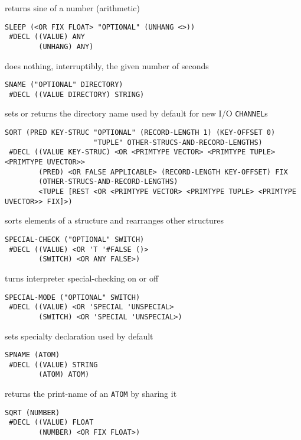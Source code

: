 \documentclass[a4paper]{scrbook}
\begin{document}
returns sine of a number (arithmetic)

\begin{verbatim}
SLEEP (<OR FIX FLOAT> "OPTIONAL" (UNHANG <>))
 #DECL ((VALUE) ANY
        (UNHANG) ANY)
\end{verbatim}

does nothing, interruptibly, the given number of seconds

\begin{verbatim}
SNAME ("OPTIONAL" DIRECTORY)
 #DECL ((VALUE DIRECTORY) STRING)
\end{verbatim}

sets or returns the directory name used by default for new I/O \texttt{CHANNEL}s

\begin{verbatim}
SORT (PRED KEY-STRUC "OPTIONAL" (RECORD-LENGTH 1) (KEY-OFFSET 0)
                     "TUPLE" OTHER-STRUCS-AND-RECORD-LENGTHS)
 #DECL ((VALUE KEY-STRUC) <OR <PRIMTYPE VECTOR> <PRIMTYPE TUPLE> <PRIMTYPE UVECTOR>>
        (PRED) <OR FALSE APPLICABLE> (RECORD-LENGTH KEY-OFFSET) FIX
        (OTHER-STRUCS-AND-RECORD-LENGTHS)
        <TUPLE [REST <OR <PRIMTYPE VECTOR> <PRIMTYPE TUPLE> <PRIMTYPE UVECTOR>> FIX]>)
\end{verbatim}

sorts elements of a structure and rearranges other structures

\begin{verbatim}
SPECIAL-CHECK ("OPTIONAL" SWITCH)
 #DECL ((VALUE) <OR 'T '#FALSE ()>
        (SWITCH) <OR ANY FALSE>)
\end{verbatim}

turns interpreter special-checking on or off

\begin{verbatim}
SPECIAL-MODE ("OPTIONAL" SWITCH)
 #DECL ((VALUE) <OR 'SPECIAL 'UNSPECIAL>
        (SWITCH) <OR 'SPECIAL 'UNSPECIAL>)
\end{verbatim}

sets specialty declaration used by default

\begin{verbatim}
SPNAME (ATOM)
 #DECL ((VALUE) STRING
        (ATOM) ATOM)
\end{verbatim}

returns the print-name of an \texttt{ATOM} by sharing it

\begin{verbatim}
SQRT (NUMBER)
 #DECL ((VALUE) FLOAT
        (NUMBER) <OR FIX FLOAT>)
\end{verbatim}
\end{document}
